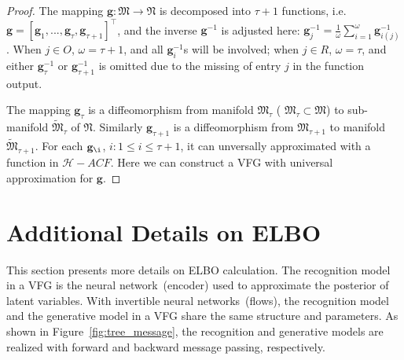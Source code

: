 \documentclass[sigconf, anonymous, review]{acmart}
\theoremstyle{plain}
\theoremstyle{definition}
\theoremstyle{remark}
\newtheorem{remark}[theorem]{Remark}
\begin{document}
\begin{proof}
The mapping $\mathbf{g}:\mathfrak{M}  \rightarrow \mathfrak{N}$ is decomposed into $\tau + 1$ functions, i.e.  $\mathbf{g}=[\mathbf{g}_1, ..., \mathbf{g}_{\tau}, \mathbf{g}_{\tau+1}]^{\top}$, and the inverse $\mathbf{g}^{-1}$ is adjusted here:  $\mathbf{g}_j^{-1} = \frac{1}{\omega} \sum_{i=1}^{\omega} \mathbf{g}^{-1}_{i(j)}$. When $j\in O$, $\omega = \tau +1$, and all $\mathbf{g}^{-1}_i$s will be involved; when $j\in R$, $\omega = \tau$, and either $\mathbf{g}^{-1}_{\tau}$  or $\mathbf{g}^{-1}_{\tau +1}$ is omitted due to the missing of  entry $j$ in the function output. 

The mapping  $\mathbf{g}_{\tau}$  is a diffeomorphism from manifold  $\mathfrak{M}_{\tau}$ ( $\mathfrak{M}_{\tau} \subset \mathfrak{M}$) to  sub-manifold $\tilde{\mathfrak{M}}_{\tau}$  of $\mathfrak{N}$. Similarly 
 $\mathbf{g}_{\tau+1}$ is a  diffeomorphism from  $\mathfrak{M}_{\tau+1}$  to  manifold $\tilde{\mathfrak{M}}_{\tau+1}$.  For each $\mathbf{g}_{\i}$, $i:1\leq i \leq \tau +1$, it can unversally approximated with a function in $\mathcal{H}-ACF$. Here we can construct a VFG with universal approximation for $\mathbf{g}$. 

\end{proof}



\section{Additional Details on ELBO}\label{sec:elbo_cal_supp}
This section presents more details on ELBO calculation. 
The recognition model in a VFG is the neural network~(encoder) used to approximate the posterior of latent variables. 
With invertible neural networks~(flows), the recognition model and the generative model in a VFG share the same structure and parameters.  As shown in Figure~\ref{fig:tree_message},    the recognition and generative models are realized with  forward and backward message passing, respectively.
\end{document}
